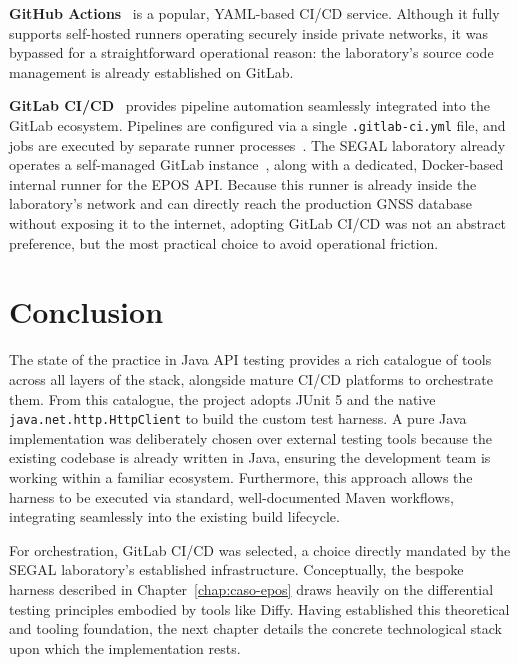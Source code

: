 \textbf{GitHub Actions}~\cite{githubActions} is a popular, \ac{YAML}-based \ac{CI}/\ac{CD}
service. Although it fully supports self-hosted runners operating securely
inside private networks, it was bypassed for a straightforward operational reason:
the laboratory's source code management is already established on GitLab.

\textbf{GitLab \ac{CI}/\ac{CD}}~\cite{gitlabci} provides pipeline automation
seamlessly integrated into the GitLab ecosystem. Pipelines are configured
via a single \texttt{.gitlab-ci.yml} file, and jobs are executed by
separate runner processes~\cite{gitlabRunner}. The \ac{SEGAL} laboratory
already operates a self-managed GitLab instance~\cite{gitlabSelfManaged}, along
with a dedicated, Docker-based internal runner for the \ac{EPOS} \ac{API}. Because
this runner is already inside the laboratory's network and can directly reach
the production \ac{GNSS} database without exposing it to the internet, adopting
GitLab \ac{CI}/\ac{CD} was not an abstract preference, but the most
practical choice to avoid operational friction.

\section{Conclusion}
\label{chap2:sec:concs}

The state of the practice in Java \ac{API} testing provides a rich
catalogue of tools across all layers of the stack, alongside mature \ac{CI}/\ac{CD}
platforms to orchestrate them. From this catalogue, the project adopts JUnit
5 and the native \texttt{java.net.http.HttpClient} to build the custom test
harness. A pure Java implementation was deliberately chosen over external testing
tools because the existing codebase is already written in Java, ensuring
the development team is working within a familiar ecosystem. Furthermore,
this approach allows the harness to be executed via standard, well-documented
Maven workflows, integrating seamlessly into the existing build lifecycle.

For orchestration, GitLab \ac{CI}/\ac{CD} was selected, a choice directly
mandated by the \ac{SEGAL} laboratory's established infrastructure.
Conceptually, the bespoke harness described in Chapter~\ref{chap:caso-epos} draws
heavily on the differential testing principles embodied by tools like Diffy.
Having established this theoretical and tooling foundation, the next chapter
details the concrete technological stack upon which the implementation rests.